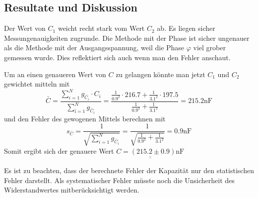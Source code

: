 \subsection{Resultate und Diskussion}

Der Wert von $C_1$ weicht recht stark vom Wert $C_2$ ab. Es liegen sicher Messungenauigkeiten
zugrunde. Die Methode mit der Phase ist sicher ungenauer als die Methode mit der Ausgangsspannung,
weil die Phase $\varphi$ viel grober gemessen wurde. Dies reflektiert sich auch wenn man den Fehler
anschaut.

Um an einen genaueren Wert von $C$ zu gelangen k\"onnte man jetzt $C_1$ und $C_2$ gewichtet
mitteln mit
\begin{equation}
    \bar{C} = \frac{ \sum_{i=1}^{N} g_{\bar{C}_i} \cdot C_i }{ \sum_{í=1}^{N} g_{\bar{C}_i} }
            = \frac{ \frac{1}{0.9^2} \cdot 216.7 + \frac{1}{3.1^2} \cdot 197.5}{ \frac{1}{0.9^2} + \frac{1}{3.1^2} } = 215.2 \textrm{nF}
\end{equation}
und den Fehler des gewogenen Mittels berechnen mit
\begin{equation}
    s_{\bar{C}} = \frac{1}{\sqrt{\sum_{i=1}^{N} g_{\bar{C}_i}}} = \frac{1}{\sqrt{\frac{1}{0.9^2} + \frac{1}{3.1^2}}} = 0.9 \textrm{nF}
\end{equation}
Somit ergibt sich der genauere Wert $\underline{\underline{C = (215.2 \pm 0.9) \textrm{nF}}}$

Es ist zu beachten, dass der berechnete Fehler der Kapazit\"at nur den statistischen Fehler
darstellt. Als systematischer Fehler m\"usste noch die Unsicherheit des Widerstandwertes
mitber\"ucksichtigt werden.

